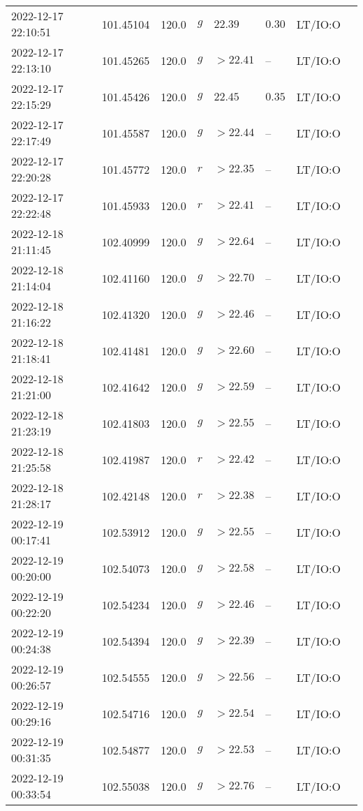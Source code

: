 \documentclass{nature_plusfigure}
\begin{document}
\begin{supplement}
\begin{center}
\begin{longtable}{llllllll}
2022-12-17 22:10:51 & 101.45104 & 120.0 & $g$ & $22.39$ & $0.30$ & LT/IO:O &  \\ 
2022-12-17 22:13:10 & 101.45265 & 120.0 & $g$ & $>22.41$ & -- & LT/IO:O &  \\ 
2022-12-17 22:15:29 & 101.45426 & 120.0 & $g$ & $22.45$ & $0.35$ & LT/IO:O &  \\ 
2022-12-17 22:17:49 & 101.45587 & 120.0 & $g$ & $>22.44$ & -- & LT/IO:O &  \\ 
2022-12-17 22:20:28 & 101.45772 & 120.0 & $r$ & $>22.35$ & -- & LT/IO:O &  \\ 
2022-12-17 22:22:48 & 101.45933 & 120.0 & $r$ & $>22.41$ & -- & LT/IO:O &  \\ 
2022-12-18 21:11:45 & 102.40999 & 120.0 & $g$ & $>22.64$ & -- & LT/IO:O &  \\ 
2022-12-18 21:14:04 & 102.41160 & 120.0 & $g$ & $>22.70$ & -- & LT/IO:O &  \\ 
2022-12-18 21:16:22 & 102.41320 & 120.0 & $g$ & $>22.46$ & -- & LT/IO:O &  \\ 
2022-12-18 21:18:41 & 102.41481 & 120.0 & $g$ & $>22.60$ & -- & LT/IO:O &  \\ 
2022-12-18 21:21:00 & 102.41642 & 120.0 & $g$ & $>22.59$ & -- & LT/IO:O &  \\ 
2022-12-18 21:23:19 & 102.41803 & 120.0 & $g$ & $>22.55$ & -- & LT/IO:O &  \\ 
2022-12-18 21:25:58 & 102.41987 & 120.0 & $r$ & $>22.42$ & -- & LT/IO:O &  \\ 
2022-12-18 21:28:17 & 102.42148 & 120.0 & $r$ & $>22.38$ & -- & LT/IO:O &  \\ 
2022-12-19 00:17:41 & 102.53912 & 120.0 & $g$ & $>22.55$ & -- & LT/IO:O &  \\ 
2022-12-19 00:20:00 & 102.54073 & 120.0 & $g$ & $>22.58$ & -- & LT/IO:O &  \\ 
2022-12-19 00:22:20 & 102.54234 & 120.0 & $g$ & $>22.46$ & -- & LT/IO:O &  \\ 
2022-12-19 00:24:38 & 102.54394 & 120.0 & $g$ & $>22.39$ & -- & LT/IO:O &  \\ 
2022-12-19 00:26:57 & 102.54555 & 120.0 & $g$ & $>22.56$ & -- & LT/IO:O &  \\ 
2022-12-19 00:29:16 & 102.54716 & 120.0 & $g$ & $>22.54$ & -- & LT/IO:O &  \\ 
2022-12-19 00:31:35 & 102.54877 & 120.0 & $g$ & $>22.53$ & -- & LT/IO:O &  \\ 
2022-12-19 00:33:54 & 102.55038 & 120.0 & $g$ & $>22.76$ & -- & LT/IO:O &  \\ 

\end{longtable}
\end{center}
\end{supplement}
\end{document}
